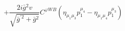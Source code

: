 %
\begin{dmath*}
%
  +  \frac{2 i {\bar g}{}^2 v}{\sqrt{{\bar g}^{\prime 2} + {\bar g}{}^2}}C^{ \varphi  WB} \left(\eta_{\mu_1 \mu_3} p_1^{\mu_4} - \eta_{\mu_1 \mu_4} p_1^{\mu_3}\right)
%
\end{dmath*}
%
